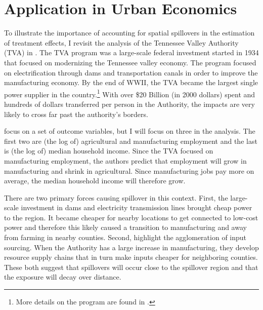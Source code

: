 \documentclass[11pt]{article}
\begin{document}



\section{Application in Urban Economics}

To illustrate the importance of accounting for spatial spillovers in the estimation of treatment effects, I revisit the analysis of the Tennessee Valley Authority (TVA) in \citet{Kline_Moretti_2014}. The TVA program was a large-scale federal investment started in 1934 that focused on modernizing the Tennessee valley economy. The program focused on electrification through dams and transportation canals in order to improve the manufacturing economy. By the end of WWII, the TVA became the largest single power supplier in the country.\footnote{More details on the program are found in \citet{Kline_Moretti_2014}.} With over \$20 Billion (in 2000 dollars) spent and hundreds of dollars transferred per person in the Authority, the impacts are very likely to cross far past the authority's borders. 

\citet{Kline_Moretti_2014} focus on a set of outcome variables, but I will focus on three in the analysis. The first two are (the log of) agricultural and manufacturing employment and the last is (the log of) median household income. Since the TVA focused on manufacturing employment, the authors predict that employment will grow in manufacturing and shrink in agricultural. Since manufacturing jobs pay more on average, the median household income will therefore grow. 

There are two primary forces causing spillover in this context. First, the large-scale investment in dams and electricity transmission lines brought cheap power to the region. It became cheaper for nearby locations to get connected to low-cost power and therefore this likely caused a transition to manufacturing and away from farming in nearby counties. Second, \citet{Duranton_Puga_2003} highlight the agglomeration of input sourcing. When the Authority has a large increase in manufacturing, they develop resource supply chains that in turn make inputs cheaper for neighboring counties. These both suggest that spillovers will occur close to the spillover region and that the exposure will decay over distance.
\end{document}
